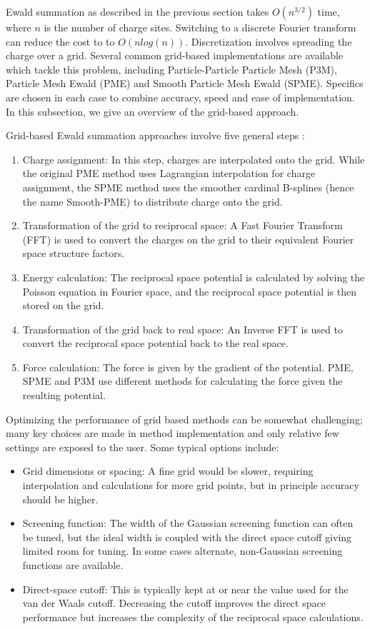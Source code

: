 \documentclass[9pt,bestpractices]{livecoms}
\begin{document}
Ewald summation as described in the previous section takes $O(n^{3/2})$ time, where $n$ is the number of charge sites.
Switching to a discrete Fourier transform can reduce the cost to to $O(n log(n))$.
Discretization involves spreading the charge over a grid. 
Several common grid-based implementations are available which tackle this problem, including Particle-Particle Particle Mesh (P3M), Particle Mesh Ewald (PME) and Smooth Particle Mesh Ewald (SPME). 
Specifics are chosen in each case to combine accuracy, speed and ease of implementation.
In this subsection, we give an overview of the grid-based approach.

Grid-based Ewald summation approaches involve five general steps :
\begin{enumerate}
\item Charge assignment: In this step, charges are interpolated onto the grid.
While the original PME method uses Lagrangian interpolation for charge assignment, the SPME method uses the smoother cardinal B-splines (hence the name Smooth-PME) to distribute charge onto the grid. 

\item Transformation of the grid to reciprocal space: A Fast Fourier Transform (FFT) is used to convert the charges on the grid to their equivalent Fourier space structure factors.

\item Energy calculation: The reciprocal space potential is calculated by solving the Poisson equation in Fourier space, and the reciprocal space potential is then stored on the grid.

\item Transformation of the grid back to real space: An Inverse FFT is used to convert the reciprocal space potential back to the real space. 
\item Force calculation: The force is given by the gradient of the potential.
PME, SPME and P3M use different methods for calculating the force given the resulting potential. 
\end{enumerate}


Optimizing the performance of grid based methods can be somewhat challenging; many key choices are made in method implementation and only relative few settings are exposed to the user.
Some typical options include: 
 
\begin{itemize}
\item Grid dimensions or spacing: A fine grid would be slower, requiring interpolation and calculations for more grid points, but in principle accuracy should be higher.
\item Screening function: The width of the Gaussian screening function can often be tuned, but the ideal width is coupled with the direct space cutoff giving limited room for tuning. In some cases alternate, non-Gaussian screening functions are available.
\item Direct-space cutoff: This is typically kept at or near the value used for the van der Waals cutoff.
Decreasing the cutoff improves the direct space performance but increases the complexity of the reciprocal space calculations. 
\end{itemize}
\end{document}
